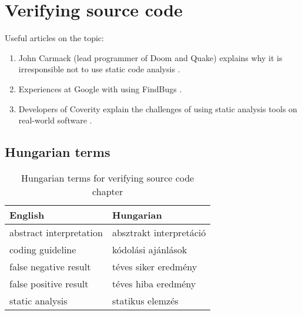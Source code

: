 \chapter{Verifying source code}

Useful articles on the topic:

\begin{enumerate}
    \item John Carmack (lead programmer of Doom and Quake) explains why it is irresponsible not to use static code analysis \cite{carmack-2011}.
    \item Experiences at Google with using FindBugs \cite{findbugs-2008}.
    \item Developers of Coverity explain the challenges of using static analysis tools on real-world software \cite{coverity-2010}.
\end{enumerate}


\section{Hungarian terms}

\begin{table}[ht]
    \centering
    \small
    \caption{Hungarian terms for verifying source code chapter}
    \begin{tabular}{ll}
        \toprule
        \textbf{English} & \textbf{Hungarian} \\
        \midrule
        abstract interpretation & absztrakt interpretáció \\
        coding guideline & kódolási ajánlások \\
        false negative result & téves siker eredmény \\
        false positive result & téves hiba eredmény \\
        static analysis & statikus elemzés \\
        \bottomrule
        \end{tabular}
        \label{tab:overview:hungarian-terms-code}
        \end{table}